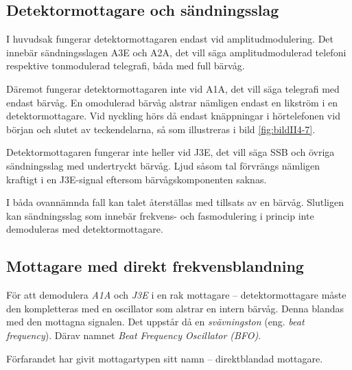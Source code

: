 \newpage


\subsection{Detektormottagare och sändningsslag}

I huvudsak fungerar detektormottagaren endast vid amplitudmodulering.
Det innebär sändningsslagen A3E och A2A, det vill säga amplitudmodulerad
telefoni respektive tonmodulerad telegrafi, båda med full bärvåg.

Däremot fungerar detektormottagaren inte vid A1A, det vill säga telegrafi med
endast bärvåg.
En omodulerad bärvåg alstrar nämligen endast en likström i en
detektormottagare.
Vid nyckling hörs då endast knäppningar i hörtelefonen vid början och
slutet av teckendelarna, så som illustreras i bild \ref{fig:bildII4-7}.

Detektormottagaren fungerar inte heller vid J3E, det vill säga SSB och övriga
sändningsslag med undertryckt bärvåg.
Ljud såsom tal förvrängs nämligen kraftigt i en J3E-signal eftersom
bärvågskomponenten saknas.

I båda ovannämnda fall kan talet återställas med tillsats av en bärvåg.
Slutligen kan sändningsslag som innebär frekvens- och fasmodulering i
princip inte demoduleras med detektormottagare.


\subsection{Mottagare med direkt frekvensblandning}

För att demodulera \emph{A1A} och \emph{J3E} i en rak mottagare --
detektormottagare måste den kompletteras med en oscillator som alstrar en
intern bärvåg.
Denna blandas med den mottagna signalen.
Det uppstår då en \emph{svävningston} (eng. \emph{beat frequency}).
Därav namnet \emph{Beat Frequency Oscillator (BFO)}.

Förfarandet har givit mottagartypen sitt namn -- direktblandad mottagare.

